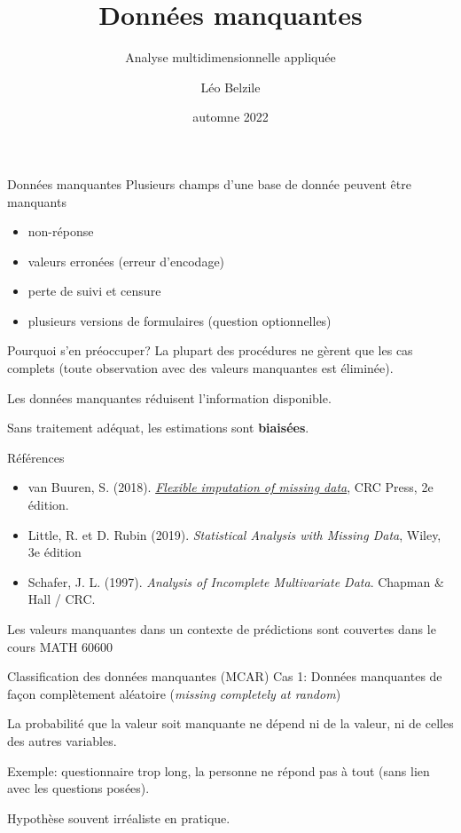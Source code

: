 \documentclass[
  ignorenonframetext,
]{beamer}
\title{Données manquantes}
\subtitle{Analyse multidimensionnelle appliquée}
\author{Léo Belzile}
\date{automne 2022}
\institute{HEC Montréal}
\providecommand{\tightlist}{%
  \setlength{\itemsep}{0pt}\setlength{\parskip}{0pt}}\usepackage{longtable,booktabs,array}
\begin{document}
\frame{\titlepage}
\ifdefined\Shaded\renewenvironment{Shaded}{\begin{tcolorbox}[boxrule=0pt, borderline west={3pt}{0pt}{shadecolor}, interior hidden, breakable, sharp corners, enhanced, frame hidden]}{\end{tcolorbox}}\fi

\begin{frame}{Données manquantes}
\protect\hypertarget{donnuxe9es-manquantes}{}
Plusieurs champs d'une base de donnée peuvent être manquants

\begin{itemize}
\tightlist
\item
  non-réponse
\item
  valeurs erronées (erreur d'encodage)
\item
  perte de suivi et censure
\item
  plusieurs versions de formulaires (question optionnelles)
\end{itemize}
\end{frame}

\begin{frame}{Pourquoi s'en préoccuper?}
\protect\hypertarget{pourquoi-sen-pruxe9occuper}{}
La plupart des procédures ne gèrent que les cas complets (toute
observation avec des valeurs manquantes est éliminée).

Les données manquantes réduisent l'information disponible.

Sans traitement adéquat, les estimations sont \textbf{biaisées}.
\end{frame}

\begin{frame}{Références}
\protect\hypertarget{ruxe9fuxe9rences}{}
\begin{itemize}
\tightlist
\item
  van Buuren, S. (2018).
  \href{https://stefvanbuuren.name/fimd/}{\emph{Flexible imputation of
  missing data}}, CRC Press, 2e édition.
\item
  Little, R. et D. Rubin (2019). \emph{Statistical Analysis with Missing
  Data}, Wiley, 3e édition
\item
  Schafer, J. L. (1997). \emph{Analysis of Incomplete Multivariate
  Data}. Chapman \& Hall / CRC.
\end{itemize}

Les valeurs manquantes dans un contexte de prédictions sont couvertes
dans le cours MATH 60600
\end{frame}

\begin{frame}{Classification des données manquantes (MCAR)}
\protect\hypertarget{classification-des-donnuxe9es-manquantes-mcar}{}
Cas 1: Données manquantes de façon complètement aléatoire (\emph{missing
completely at random})

La probabilité que la valeur soit manquante ne dépend ni de la valeur,
ni de celles des autres variables.

Exemple: questionnaire trop long, la personne ne répond pas à tout (sans
lien avec les questions posées).

Hypothèse souvent irréaliste en pratique.
\end{frame}
\end{document}
